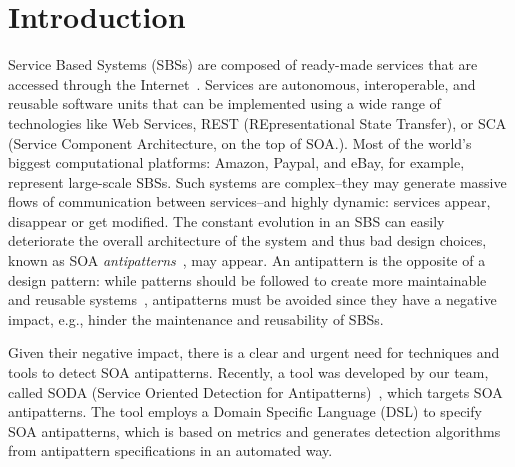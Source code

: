 
\section{Introduction}

Service Based Systems (SBSs) are composed of ready-made services that are accessed through the Internet~\cite{erl2006service}. Services
are autonomous, interoperable, and reusable software units that can be implemented
using a wide range of technologies like Web Services, REST (REpresentational
State Transfer), or SCA (Service Component Architecture, on the top of SOA.). Most of
the world's biggest computational platforms: Amazon, Paypal, and eBay, for example, represent large-scale SBSs. Such systems are complex--they may generate massive flows of
communication between services--and highly dynamic: services appear, disappear or get modified.
The constant evolution in an SBS can easily deteriorate the
overall architecture of the system and thus bad design choices, known as SOA \textit{antipatterns}~\cite{Moha12-ICSOC-SOASpecificationDetection}, may appear.
An antipattern is the opposite of a design pattern: while
patterns should be followed to create more maintainable and reusable
systems~\cite{wolfgang1994design}, antipatterns must be avoided
since they have a negative impact, e.g., hinder the maintenance and reusability of SBSs.

Given their negative impact, there is a clear and urgent need for techniques and tools to detect SOA antipatterns. Recently, a tool was developed by our team, called SODA (Service Oriented Detection for Antipatterns)~\cite{Moha12-ICSOC-SOASpecificationDetection,Nayrolles12-ICSOC-SODA}, which targets SOA antipatterns. The tool employs a Domain Specific Language (DSL) to specify SOA antipatterns, which is based on metrics and generates detection algorithms from antipattern specifications in an automated way.


